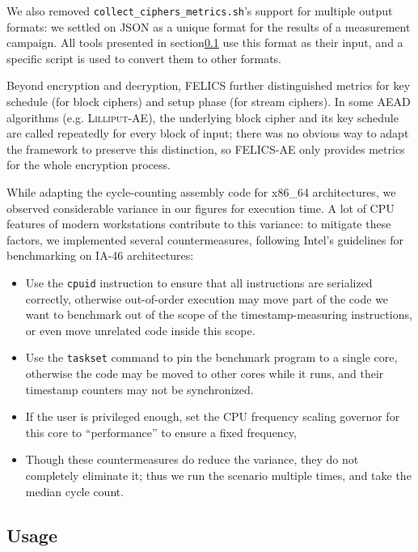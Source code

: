 \documentclass{article}
\begin{document}
We also removed \texttt{collect\_ciphers\_metrics.sh}'s support for
multiple output formats: we settled on JSON as a unique format for the
results of a measurement campaign.  All tools presented in
section\ref{sec:felics-ae/usage} use this format as their input, and a
specific script is used to convert them to other formats.

Beyond encryption and decryption, FELICS further distinguished metrics
for key schedule (for block ciphers) and setup phase (for stream
ciphers).  In some AEAD algorithms (e.g. \textsc{Lilliput-AE}), the
underlying block cipher and its key schedule are called repeatedly for
every block of input; there was no obvious way to adapt the framework
to preserve this distinction, so FELICS-AE only provides metrics for
the whole encryption process.

While adapting the cycle-counting assembly code for x86\_64
architectures, we observed considerable variance in our figures for
execution time.  A lot of CPU features of modern workstations
contribute to this variance: to mitigate these factors, we implemented
several countermeasures, following Intel's guidelines for benchmarking
on IA-46 architectures\cite{Intel:64bit-ISA-bench}:

\begin{itemize}
\item Use the \texttt{cpuid} instruction to ensure that all
  instructions are serialized correctly, otherwise out-of-order
  execution may move part of the code we want to benchmark out of the
  scope of the timestamp-measuring instructions, or even move
  unrelated code inside this scope.

\item Use the \texttt{taskset} command to pin the benchmark program to
  a single core, otherwise the code may be moved to other cores while
  it runs, and their timestamp counters may not be synchronized.

\item If the user is privileged enough, set the CPU frequency scaling
  governor for this core to ``performance'' to ensure a fixed
  frequency,

\item Though these countermeasures do reduce the variance, they do not
  completely eliminate it; thus we run the scenario multiple times,
  and take the median cycle count.
\end{itemize}

\subsection{Usage}
\label{sec:felics-ae/usage}
\end{document}
